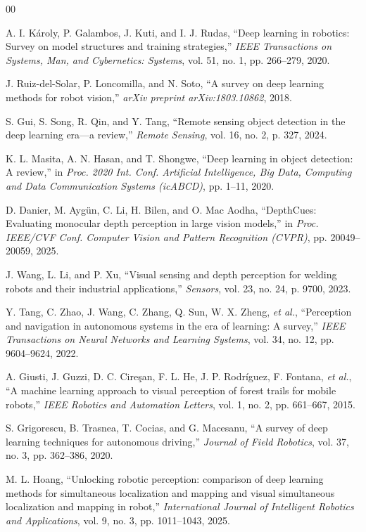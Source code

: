 \documentclass[conference]{IEEEtran}
\begin{document}
\begin{thebibliography}{00}

A. I. Károly, P. Galambos, J. Kuti, and I. J. Rudas,
``Deep learning in robotics: Survey on model structures and training strategies,''
\textit{IEEE Transactions on Systems, Man, and Cybernetics: Systems}, vol. 51, no. 1, pp. 266--279, 2020.

J. Ruiz-del-Solar, P. Loncomilla, and N. Soto,
``A survey on deep learning methods for robot vision,''
\textit{arXiv preprint arXiv:1803.10862}, 2018.

S. Gui, S. Song, R. Qin, and Y. Tang,
``Remote sensing object detection in the deep learning era—a review,''
\textit{Remote Sensing}, vol. 16, no. 2, p. 327, 2024.

K. L. Masita, A. N. Hasan, and T. Shongwe,
``Deep learning in object detection: A review,''
in \textit{Proc. 2020 Int. Conf. Artificial Intelligence, Big Data, Computing and Data Communication Systems (icABCD)}, pp. 1--11, 2020.

D. Danier, M. Aygün, C. Li, H. Bilen, and O. Mac Aodha,
``DepthCues: Evaluating monocular depth perception in large vision models,''
in \textit{Proc. IEEE/CVF Conf. Computer Vision and Pattern Recognition (CVPR)}, pp. 20049--20059, 2025.

J. Wang, L. Li, and P. Xu,
``Visual sensing and depth perception for welding robots and their industrial applications,''
\textit{Sensors}, vol. 23, no. 24, p. 9700, 2023.

Y. Tang, C. Zhao, J. Wang, C. Zhang, Q. Sun, W. X. Zheng, \textit{et al.},
``Perception and navigation in autonomous systems in the era of learning: A survey,''
\textit{IEEE Transactions on Neural Networks and Learning Systems}, vol. 34, no. 12, pp. 9604--9624, 2022.

A. Giusti, J. Guzzi, D. C. Cireşan, F. L. He, J. P. Rodríguez, F. Fontana, \textit{et al.},
``A machine learning approach to visual perception of forest trails for mobile robots,''
\textit{IEEE Robotics and Automation Letters}, vol. 1, no. 2, pp. 661--667, 2015.

S. Grigorescu, B. Trasnea, T. Cocias, and G. Macesanu,
``A survey of deep learning techniques for autonomous driving,''
\textit{Journal of Field Robotics}, vol. 37, no. 3, pp. 362--386, 2020.

M. L. Hoang,
``Unlocking robotic perception: comparison of deep learning methods for simultaneous localization and mapping and visual simultaneous localization and mapping in robot,''
\textit{International Journal of Intelligent Robotics and Applications}, vol. 9, no. 3, pp. 1011--1043, 2025.


\end{thebibliography}
\end{document}
